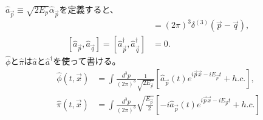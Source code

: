 \documentclass[10pt,a4paper]{jarticle}
\begin{document}
$\hat a_{\vec p} \equiv  \sqrt{2E_p} \hat \alpha_{\vec p}$を定義すると、
\begin{align}
[\hat a_{\vec p}, \hat a_{\vec q}^\dagger] &= (2\pi)^3 \delta^{(3)}(\vec p - \vec q), \\
[\hat a_{\vec p}, \hat a_{\vec q}] = [\hat a_{\vec p}^\dagger, \hat a_{\vec q}^\dagger] &= 0.
\end{align}
%
$\hat \phi$と$\hat\pi$は$\hat a$と$\hat a^\dagger$を使って書ける。
\begin{align}
\hat\phi(t,\vec x) &= \int \frac{d^3 p}{(2\pi)^3} \frac{1}{\sqrt{2E_{\vec p}}}\left[ {\hat a}_{\vec p}(t) e^{i\vec p \vec x - iE_{\vec p} t}+ h.c. \right], \label{eq:phi QFT}\\
\hat\pi(t,\vec x) &= \int \frac{d^3 p}{(2\pi)^3} \sqrt{ \frac{E_{\vec p}}{2}  }\left[ -i{\hat a}_{\vec p}(t) e^{i\vec p \vec x - iE_{\vec p} t}+ h.c. \right] \label{eq:pi QFT}
\end{align}
\end{document}
